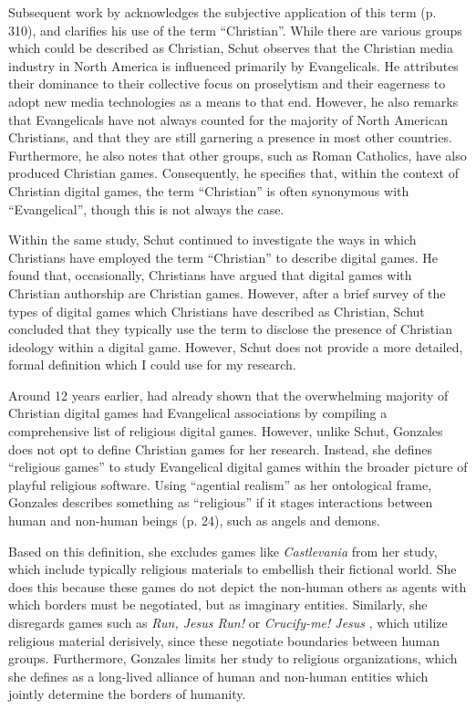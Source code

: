 Subsequent work by \textcite{schut_swords_2026} acknowledges the subjective application of this term (p. 310), and clarifies his use of the term ``Christian''. While there are various groups which could be described as Christian, Schut observes that the Christian media industry in North America is influenced primarily by Evangelicals. He attributes their dominance to their collective focus on proselytism and their eagerness to adopt new media technologies as a means to that end. However, he also remarks that Evangelicals have not always counted for the majority of North American Christians, and that they are still garnering a presence in most other countries. Furthermore, he also notes that other groups, such as Roman Catholics, have also produced Christian games. Consequently, he specifies that, within the context of Christian digital games, the term ``Christian'' is often synonymous with ``Evangelical'', though this is not always the case.

Within the same study, Schut continued to investigate the ways in which Christians have employed the term ``Christian'' to describe digital games. He found that, occasionally, Christians have argued that digital games with Christian authorship are Christian games. However, after a brief survey of the types of digital games which Christians have described as Christian, Schut concluded that they typically use the term to disclose the presence of Christian ideology within a digital game. However, Schut does not provide a more detailed, formal definition which I could use for my research.

Around 12 years earlier, \textcite{gonzalez_born-again_2014} had already shown that the overwhelming majority of Christian digital games had Evangelical associations by compiling a comprehensive list of religious digital games. However, unlike Schut, Gonzales does not opt to define Christian games for her research. Instead, she defines ``religious games'' to study Evangelical digital games within the broader picture of playful religious software. Using ``agential realism'' as her ontological frame, Gonzales describes something as ``religious'' if it stages interactions between human and non-human beings (p. 24), such as angels and demons.

Based on this definition, she excludes games like \textit{Castlevania} \parencite{hitoshi_castlevania_1986} from her study, which include typically religious materials to embellish their fictional world. She does this because these games do not depict the non-human others as agents with which borders must be negotiated, but as imaginary entities. Similarly, she disregards games such as \textit{Run, Jesus Run!} \parencite{pedercini_run_2010} or \textit{Crucify-me! Jesus} \parencite{chapman_crucify_2000}, which utilize religious material derisively, since these negotiate boundaries between human groups. Furthermore, Gonzales limits her study to religious organizations, which she defines as a long-lived alliance of human and non-human entities which jointly determine the borders of humanity. 

